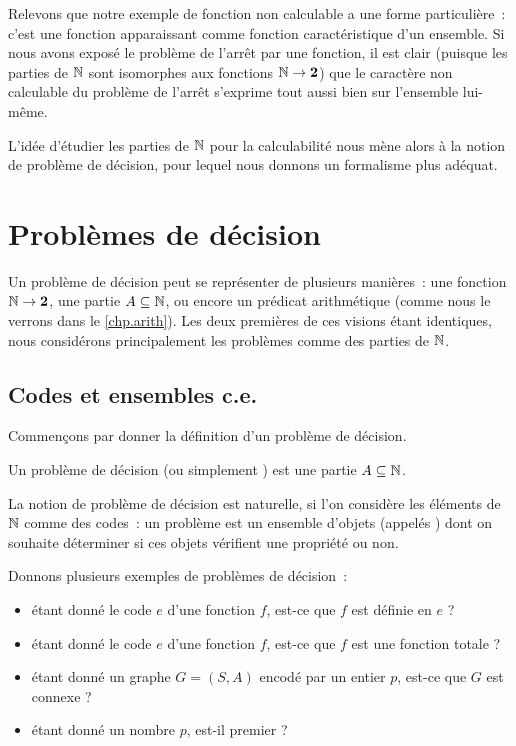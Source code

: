 Relevons que notre exemple de fonction non calculable a une forme particulière~:
c'est une fonction apparaissant comme fonction caractéristique d'un ensemble.
Si nous avons exposé le problème de l'arrêt par une fonction, il est clair
(puisque les parties de $\mathbb N$ sont isomorphes aux fonctions $\mathbb N \to \bm{2}$)
que le caractère non calculable du problème de l'arrêt s'exprime tout aussi
bien sur l'ensemble lui-même.

L'idée d'étudier les parties de $\mathbb N$ pour la calculabilité nous mène alors à
la notion de problème de décision, pour lequel nous donnons un formalisme plus
adéquat.

\section{Problèmes de décision}

Un problème de décision peut se représenter de plusieurs manières~: une fonction
$\mathbb N \to \bm{2}$, une partie $A \subseteq \mathbb N$, ou encore un prédicat
arithmétique (comme nous le verrons dans le \cref{chp.arith}). Les deux
premières de ces visions étant identiques, nous considérons principalement les
problèmes comme des parties de $\mathbb N$.

\subsection{Codes et ensembles c.e.}

Commençons par donner la définition d'un problème de décision.

\begin{definition}
  Un problème de décision (ou simplement ) est une partie
  $A \subseteq \mathbb N$.
\end{definition}

La notion de problème de décision est naturelle, si l'on considère les éléments
de $\mathbb N$ comme des codes~: un problème est un ensemble d'objets (appelés
) dont on souhaite déterminer si ces objets vérifient une
propriété ou non.

\begin{example}
  Donnons plusieurs exemples de problèmes de décision~:
  \begin{itemize}
  \item étant donné le code $e$ d'une fonction $f$, est-ce que $f$ est définie
    en $e$ ?
  \item étant donné le code $e$ d'une fonction $f$, est-ce que $f$ est une
    fonction totale ?
  \item étant donné un graphe $G = (S,A)$ encodé par un entier $p$,
    est-ce que $G$ est connexe ?
  \item étant donné un nombre $p$, est-il premier ?
  \end{itemize}
\end{example}

